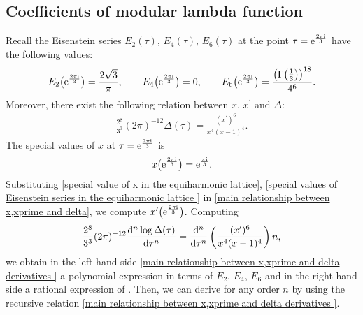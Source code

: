 \documentclass[11pt]{article}
\numberwithin{equation}{section}
\numberwithin{equation}{section}
\begin{document}
\subsection{Coefficients of modular lambda function}\label{Coefficients of Modular lambda function}

Recall the Eisenstein series $E_2(\tau)$, $E_4(\tau)$, $E_6(\tau)$ at the point $\tau={\rm e}^{\frac{2\pi {\rm i}}{3}}$ have the following values:
\begin{gather}\label{special values of Eisenstein series in the equiharmonic lattice }
E_2\bigl({\rm e}^{\frac{2\pi {\rm i}}{3}}\bigr)=\frac{2\sqrt{3}}{\pi}, \qquad E_4\bigl({\rm e}^{\frac{2\pi {\rm i}}{3}}\bigr)=0, \qquad E_6\bigl({\rm e}^{\frac{2\pi {\rm i}}{3}}\bigr)=\frac{\bigl(\Gamma\bigl(\frac{1}{3}\bigr)\bigr)^{18}}{4^6}.
\end{gather}
Moreover, there exist the following relation between $x$, $x^{\prime}$ and $\Delta$:
\begin{gather}
\frac{2^8}{3^3}(2\pi )^{-12}\Delta(\tau)=\frac{(x^{\prime})^6}{x^4(x-1)^4}.\label{main relationship between x,xprime and delta}
\end{gather}
The special values of $x$ at $\tau={\rm e}^{\frac{2\pi {\rm i}}{3}}$ is
\begin{gather}
x\bigl({\rm e}^{\frac{2\pi {\rm i}}{3}}\bigr)={\rm e}^{\frac{\pi {\rm i}}{3}}.\label{special value of x in the equiharmonic lattice}
\end{gather}
Substituting \eqref{special value of x in the equiharmonic lattice}, \eqref{special values of Eisenstein series in the equiharmonic lattice } in \eqref{main relationship between x,xprime and delta}, we compute $x^{\prime}\bigl({\rm e}^{\frac{2\pi {\rm i}}{3}}\bigr)$. Computing
\begin{gather}
\frac{2^8}{3^3}(2\pi )^{-12}\frac{{\rm d}^n\log\Delta(\tau)}{{\rm d}\tau^n}=\frac{{\rm d}^n}{{\rm d}\tau^n}\left(\frac{(x^{\prime})^6}{x^4(x-1)^4}\right)n,\label{main relationship between x,xprime and delta derivatives }
\end{gather}
we obtain in the left-hand side \eqref{main relationship between x,xprime and delta derivatives } a polynomial expression in terms of $E_2$, $E_4$, $E_6$ and in the right-hand side a rational expression of . Then, we can derive  for any order $n$ by using the recursive relation \eqref{main relationship between x,xprime and delta derivatives }.
\end{document}
